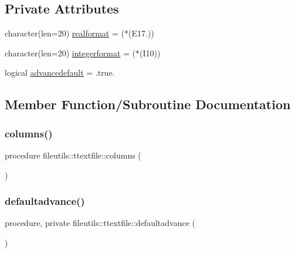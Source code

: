 \subsection*{Private Attributes}
\begin{DoxyCompactItemize}
\item 
character(len=20) \mbox{\hyperlink{structfileutils_1_1ttextfile_acdb4cf6536a6fbf2b26e39e5ed92de5d}{realformat}} = \textquotesingle{}($\ast$(E17.))\textquotesingle{}
\item 
character(len=20) \mbox{\hyperlink{structfileutils_1_1ttextfile_ae13395763c0f8c678fbaa6905f391450}{integerformat}} = \textquotesingle{}($\ast$(I10))\textquotesingle{}
\item 
logical \mbox{\hyperlink{structfileutils_1_1ttextfile_a0031d2133dcfbb314e9ca373786619c1}{advancedefault}} = .true.
\end{DoxyCompactItemize}


\subsection{Member Function/\+Subroutine Documentation}
\mbox{\label{structfileutils_1_1ttextfile_ad32f2adc580681fe5e19e8dee23293fa}} 
\subsubsection{\texorpdfstring{columns()}{columns()}}
{\footnotesize\ttfamily procedure fileutils\+::ttextfile\+::columns (\begin{DoxyParamCaption}{ }\end{DoxyParamCaption})\hspace{0.3cm}{\ttfamily [private]}}

\mbox{\label{structfileutils_1_1ttextfile_af2a76455d8772ab315068adb3fc98393}} 
\subsubsection{\texorpdfstring{defaultadvance()}{defaultadvance()}}
{\footnotesize\ttfamily procedure, private fileutils\+::ttextfile\+::defaultadvance (\begin{DoxyParamCaption}{ }\end{DoxyParamCaption})\hspace{0.3cm}{\ttfamily [private]}}

